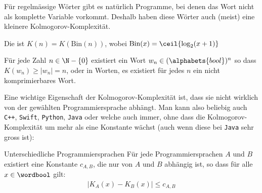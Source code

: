 \proven


Für regelmässige Wörter gibt es natürlich Programme, bei denen das Wort nicht als komplette Variable vorkommt.
Deshalb haben diese Wörter auch (meist) eine kleinere Kolmogorov-Komplexität.


 Die  ist $K(n) = K(\text{Bin}(n))$,
wobei $\text{Bin}(x) = \ceil{\log_2(x + 1)}$ %

\inlinelemma Für jede Zahl $n \in \N - \{ 0 \}$ existiert ein Wort $w_n \in (\alphabets{bool})^n$ so dass $K(w_n) \geq |w_n| = n$, oder in Worten, es existiert für jedes $n$ ein nicht komprimierbares Wort.

Eine wichtige Eigenschaft der Kolmogorov-Komplexität ist, dass sie nicht wirklich von der gewählten Programmiersprache abhängt.
Man kann also beliebig auch \texttt{C++}, \texttt{Swift}, \texttt{Python}, \texttt{Java} oder welche auch immer, ohne dass die Kolmogorov-Komplexität um mehr als eine Konstante wächst (auch wenn diese bei \texttt{Java} sehr gross ist):

\begin{theorem}[]{Unterschiedliche Programmiersprachen}
	Für jede Programmiersprachen $A$ und $B$ existiert eine Konstante $c_{A,B}$, die nur von $A$ und $B$ abhängig ist, so dass für alle $x \in \wordbool$ gilt:
	\begin{align*}
		|K_A(x) - K_B(x)| \leq c_{A, B}
	\end{align*}
\end{theorem}
